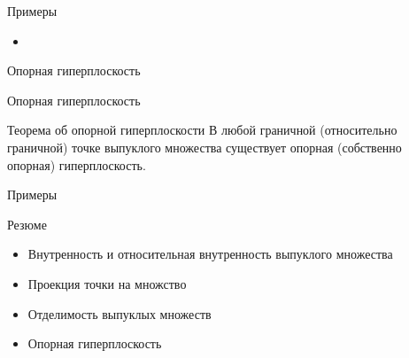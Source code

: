 \documentclass[12pt,russian]{beamer}
\begin{document}
\begin{frame}{Примеры}
\begin{itemize}
\item 
\end{itemize}
\end{frame}
\begin{frame}{Опорная гиперплоскость}
\begin{block}{Опорная гиперплоскость}

\end{block}

\begin{block}{Теорема об опорной гиперплоскости}
В любой граничной (относительно граничной) точке выпуклого множества существует опорная (собственно опорная) гиперплоскость.
\end{block}
\end{frame}

\begin{frame}{Примеры}

\end{frame}
\begin{frame}{Резюме}
\begin{itemize}
\item Внутренность и относительная внутренность выпуклого множества
\item Проекция точки на множство
\item Отделимость выпуклых множеств
\item Опорная гиперплоскость
\end{itemize}
\end{frame}
\end{document}
